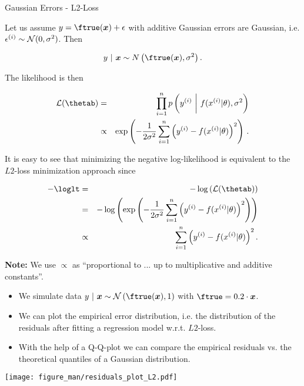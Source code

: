 \begin{vbframe}{Gaussian Errors - L2-Loss} 

Let us assume $y = \ftrue(\xv) + \eps$ with additive Gaussian errors are Gaussian, i.e. $\epsilon^{(i)} \sim \mathcal{N}(0, \sigma^2)$. Then

$$y~|~\xv \sim N\left(\ftrue(\xv), \sigma^2\right).$$


The likelihood is then 

\begin{eqnarray*}
\LL(\thetab) &=& \prod_{i=1}^n \pdf\left(\yi ~\bigg|~ \fxit, \sigma^2\right) \\ &\propto& \exp\left(-\frac{1}{2\sigma^2}\sumin \left(\yi - \fxit\right)^2\right)\,.
\end{eqnarray*}

\framebreak 

It is easy to see that minimizing the negative log-likelihood is equivalent to the $L2$-loss minimization approach since

\begin{eqnarray*}
- \loglt &=& - \log\left(\LL(\thetab)\right) \\
&=& - \log\left(\exp\left(-\frac{1}{2\sigma^2}\sumin \left(\yi - \fxit\right)^2\right)\right) \\
&\propto& \sumin \left(\yi - \fxit\right)^2.
\end{eqnarray*}


\begin{footnotesize}
\textbf{Note:} We use $\propto$ as \enquote{proportional to ... up to multiplicative and additive constants}. 
\end{footnotesize}

\framebreak 

\begin{footnotesize}
\begin{itemize}
	\item We simulate data $y ~|~\xv \sim \mathcal{N}\left(\ftrue(\xv), 1\right)$ with $\ftrue = 0.2 \cdot \xv$. 
\item We can plot the empirical error distribution, i.e. the distribution of the residuals after fitting a regression model w.r.t. $L2$-loss.
\item With the help of a Q-Q-plot we can compare the empirical residuals vs. the theoretical quantiles of a Gaussian distribution.  
\end{itemize}
\end{footnotesize}

\texttt{[image: figure\_man/residuals\_plot\_L2.pdf]}

\end{vbframe}

\endlecture

